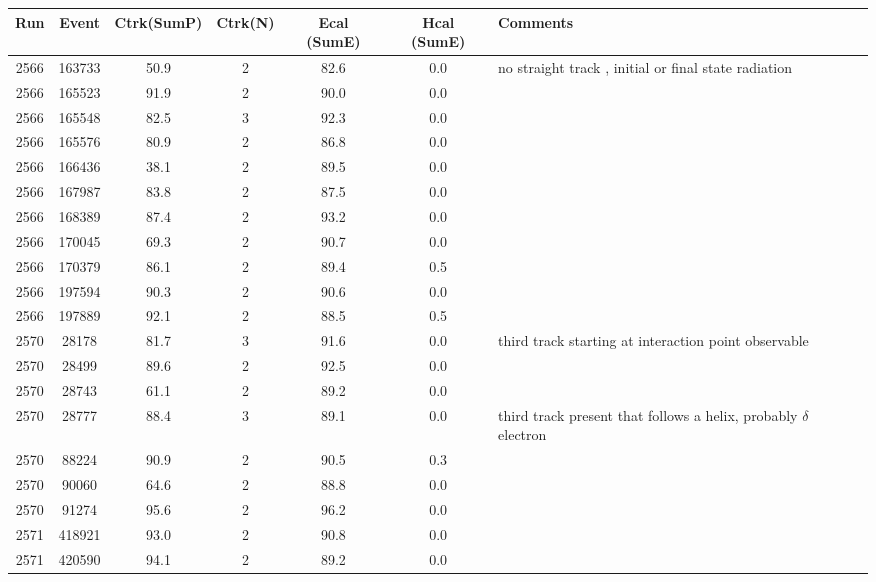 \begin{tabular}{ccccccl}
	\toprule
	Run & Event & Ctrk(SumP) & Ctrk(N) & Ecal (SumE) & Hcal (SumE) & Comments \\
	\midrule
	2566 & 163733 & 50.9       & 2       & 82.6       & 0.0        &  no straight track \korr{straight? back-to-back 2 tracks}, initial or final state radiation\\
	2566 & 165523 & 91.9       & 2       & 90.0       & 0.0        &  \\
	2566 & 165548 & 82.5       & 3       & 92.3       & 0.0        &  \\
	2566 & 165576 & 80.9       & 2       & 86.8       & 0.0        &  \\
	2566 & 166436 & 38.1       & 2       & 89.5       & 0.0        &  \\
	2566 & 167987 & 83.8       & 2       & 87.5       & 0.0        &  \\
	2566 & 168389 & 87.4       & 2       & 93.2       & 0.0        &  \\
	2566 & 170045 & 69.3       & 2       & 90.7       & 0.0        &  \\
	2566 & 170379 & 86.1       & 2       & 89.4       & 0.5        &  \\
	2566 & 197594 & 90.3       & 2       & 90.6       & 0.0        &  \\
	2566 & 197889 & 92.1       & 2       & 88.5       & 0.5        &  \\
	2570 & 28178  & 81.7       & 3       & 91.6       & 0.0        &  third track starting at interaction point observable\\
	2570 & 28499  & 89.6       & 2       & 92.5       & 0.0        &  \\
	2570 & 28743  & 61.1       & 2       & 89.2       & 0.0        &  \\
	2570 & 28777  & 88.4       & 3       & 89.1       & 0.0        &  third track present that follows a helix, probably $\delta$ electron\\
	2570 & 88224  & 90.9       & 2       & 90.5       & 0.3        &  \\
	2570 & 90060  & 64.6       & 2       & 88.8       & 0.0        &  \\
	2570 & 91274  & 95.6       & 2       & 96.2       & 0.0        &  \\
	2571 & 418921 & 93.0       & 2       & 90.8       & 0.0        &  \\
	2571 & 420590 & 94.1       & 2       & 89.2       & 0.0        &  \\
	\bottomrule
\end{tabular}
